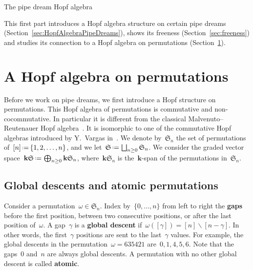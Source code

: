 \documentclass{amsart}
\makeatletter
\theoremstyle{definition}
\newcommand{\bk}{\mathbf{k}} %
\newcommand{\ssm}{\smallsetminus} %
\newcommand{\eqdef}{\mbox{\,\raisebox{0.2ex}{\scriptsize\ensuremath{\mathrm:}}\ensuremath{=}\,}} %
\newcommand{\defn}[1]{\textbf{\textsf{\color{PineGreen} #1}}} %
\newcommand{\fS}{\mathfrak{S}} %
\newcommand{\HS}{{\bk\fS}} %
\def\part{\@startsection{part}{1}%
\z@{.7\linespacing\@plus\linespacing}{.8\linespacing}%
{\LARGE\sffamily\centering}}
\makeatother
\begin{document}

\part{The pipe dream Hopf algebra}

This first part introduces a Hopf algebra structure on certain pipe dreams (Section~\ref{sec:HopfAlgebraPipeDreams}), shows its freeness (Section~\ref{sec:freeness}) and studies its connection to a Hopf algebra on permutations (Section~\ref{sec:HopfAlgebraPermutations}).


\section{A Hopf algebra on permutations}
\label{sec:HopfAlgebraPermutations}

Before we work on pipe dreams, we first introduce a Hopf structure on permutations. This Hopf algebra of permutations  is commutative and non-cocommutative. In particular it is different from the classical Malvenuto--Reutenauer Hopf algebra~\cite{MalvenutoReutenauer}. It is isomorphic to one of the commutative Hopf algebras introduced by Y.~Vargas in~\cite{Vargas}.
We denote by~$\fS_n$ the set of permutations of~$[n] \eqdef \{1,2,\ldots,n\}$, and we let~$\fS \eqdef \bigsqcup_{n \ge 0} \fS_n$. We consider the graded vector space~$\HS \eqdef \bigoplus_{n\ge 0} \HS_n$, where~$\HS_n$ is the~$\bk$-span of the permutations in~$\fS_n$.


\subsection{Global descents and atomic permutations}
\label{subsec:globalDescents}

Consider a permutation~$\omega \in \fS_n$. Index by~$\{0, \dots, n\}$ from left to right the \defn{gaps} before the first position, between two consecutive positions, or after the last position of~$\omega$. A gap~$\gamma$ is a \defn{global descent} if~$\omega([\gamma]) = [n] \ssm [n-\gamma]$. In other words, the first~$\gamma$ positions are sent to the last~$\gamma$ values. For example, the global descents in the permutation~$\omega = 635421$ are~$0, 1, 4, 5, 6$. Note that the gaps~$0$ and~$n$ are always global descents. A permutation with no other global descent is called \defn{atomic}.
\end{document}
